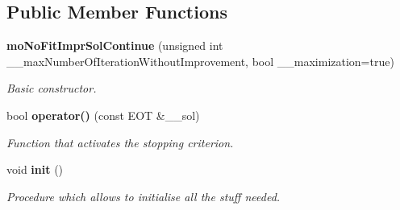 \subsection*{Public Member Functions}
\begin{CompactItemize}
\item 
{\bf moNoFitImprSolContinue} (unsigned int \_\-\_\-maxNumberOfIterationWithoutImprovement, bool \_\-\_\-maximization=true)
\begin{CompactList}\small\item\em Basic constructor. \item\end{CompactList}\item 
bool {\bf operator()} (const EOT \&\_\-\_\-sol)
\begin{CompactList}\small\item\em Function that activates the stopping criterion. \item\end{CompactList}\item 
void {\bf init} ()\label{classmo_no_fit_impr_sol_continue_21641c0a38a4501baae6133cbc591de4}

\begin{CompactList}\small\item\em Procedure which allows to initialise all the stuff needed. \item\end{CompactList}\end{CompactItemize}
